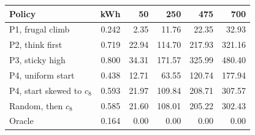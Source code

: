 \begin{tabular}{@{}lrrrrr@{}}
\toprule
Policy & kWh & 50 & 250 & 475 & 700 \\
\midrule
P1, frugal climb & 0.242 & 2.35 & 11.76 & 22.35 & 32.93 \\
P2, think first & 0.719 & 22.94 & 114.70 & 217.93 & 321.16 \\
P3, sticky high & 0.800 & 34.31 & 171.57 & 325.99 & 480.40 \\
P4, uniform start & 0.438 & 12.71 & 63.55 & 120.74 & 177.94 \\
P4, start skewed to $c_8$ & 0.593 & 21.97 & 109.84 & 208.71 & 307.57 \\
Random, then $c_8$ & 0.585 & 21.60 & 108.01 & 205.22 & 302.43 \\
Oracle & 0.164 & 0.00 & 0.00 & 0.00 & 0.00 \\
\bottomrule
\end{tabular}
